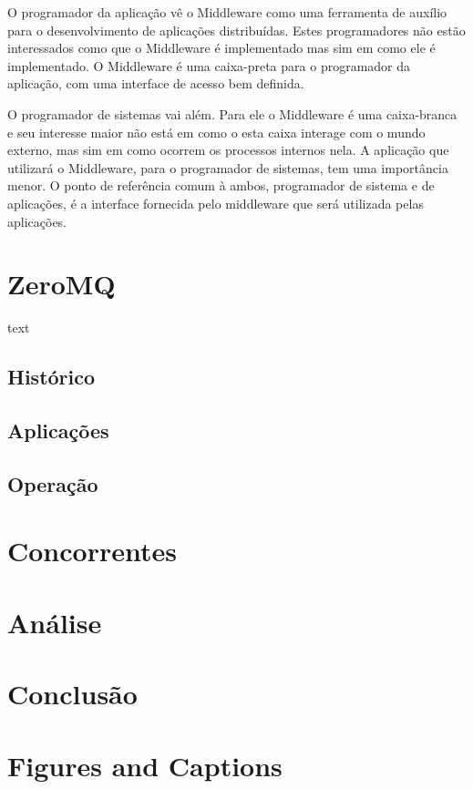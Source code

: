 \documentclass[12pt]{article}
\begin{document}
O programador da aplicação vê o Middleware como uma ferramenta de auxílio para o desenvolvimento de aplicações distribuídas. Estes programadores não estão interessados como que o Middleware é implementado mas sim em como ele é implementado. O Middleware é uma caixa-preta para o programador da aplicação, com uma interface de acesso bem definida.

O programador de sistemas vai além. Para ele o Middleware é uma caixa-branca e seu interesse maior não está em como o esta caixa interage com o mundo externo, mas sim em como ocorrem os processos internos nela. A aplicação que utilizará o Middleware, para o programador de sistemas, tem uma importância menor. O ponto de referência comum à ambos, programador de sistema e de aplicações, é a interface fornecida pelo middleware que será utilizada pelas aplicações.

\section{ZeroMQ} \label{sec:firstpage}

text

\subsection{Histórico}
\subsection{Aplicações}
\subsection{Operação}

\section{Concorrentes}

\section{Análise}
\section{Conclusão}

\section{Figures and Captions}\label{sec:figs}
\end{document}
